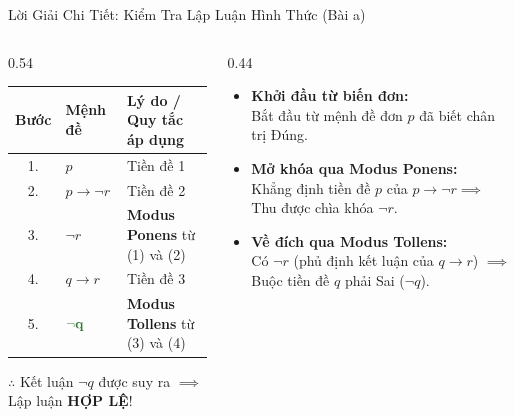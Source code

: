\documentclass[aspectratio=169, 10pt]{beamer}
\begin{document}
\begin{frame}{Lời Giải Chi Tiết: Kiểm Tra Lập Luận Hình Thức (Bài a)}
  \begin{columns}[t, onlytextwidth]
    \begin{column}{0.54\textwidth}
      \begin{cozyExample}
        \centering
        \renewcommand{\arraystretch}{1.1}
        \footnotesize
        \setlength{\tabcolsep}{3pt}
        \begin{tabular}{cll}
          \toprule
          \textbf{Bước} & \textbf{Mệnh đề} & \textbf{Lý do / Quy tắc áp dụng} \\
          \midrule
          1. & $p$ & Tiền đề 1 \\
          2. & $p \to \neg r$ & Tiền đề 2 \\
          3. & $\neg r$ & \textbf{Modus Ponens} từ (1) và (2) \\
          4. & $q \to r$ & Tiền đề 3 \\
          5. & $\mathbf{\textcolor{cozyTrue}{\neg q}}$ & \textbf{Modus Tollens} từ (3) và (4) \\
          \bottomrule
        \end{tabular}
        \par\vspace{0.08cm}
        \centering\footnotesize\color{cozyTrue}$\therefore$ Kết luận $\neg q$ được suy ra $\implies$ Lập luận \textbf{HỢP LỆ}!
      \end{cozyExample}
    \end{column}
    \begin{column}{0.44\textwidth}
      \begin{cozyInsight}
        \small
        \begin{itemize}
          \setlength{\itemsep}{2.5pt}
          \item \textbf{Khởi đầu từ biến đơn:}\\
          Bắt đầu từ mệnh đề đơn $p$ đã biết chân trị Đúng.
          \item \textbf{Mở khóa qua Modus Ponens:}\\
          Khẳng định tiền đề $p$ của $p \to \neg r \implies$ Thu được chìa khóa $\neg r$.
          \item \textbf{Về đích qua Modus Tollens:}\\
          Có $\neg r$ (phủ định kết luận của $q \to r$) $\implies$ Buộc tiền đề $q$ phải Sai ($\neg q$).
        \end{itemize}
      \end{cozyInsight}
    \end{column}
  \end{columns}
\end{frame}
\end{document}
